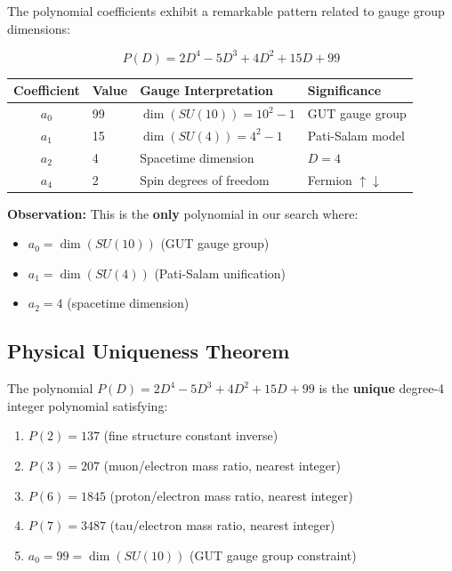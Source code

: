 \documentclass[11pt,a4paper]{article}
\begin{document}
The polynomial coefficients exhibit a remarkable pattern related to gauge group dimensions:

\[
P(D) = 2D^4 - 5D^3 + 4D^2 + 15D + 99
\]

\begin{center}
\begin{tabular}{clll}
\hline
Coefficient & Value & Gauge Interpretation & Significance \\
\hline
$a_0$ & 99 & $\dim(SU(10)) = 10^2 - 1$ & GUT gauge group \\
$a_1$ & 15 & $\dim(SU(4)) = 4^2 - 1$ & Pati-Salam model \\
$a_2$ & 4 & Spacetime dimension & $D = 4$ \\
$a_4$ & 2 & Spin degrees of freedom & Fermion $\uparrow\downarrow$ \\
\hline
\end{tabular}
\end{center}

\textbf{Observation:} This is the \textbf{only} polynomial in our search where:
\begin{itemize}
    \item $a_0 = \dim(SU(10))$ (GUT gauge group)
    \item $a_1 = \dim(SU(4))$ (Pati-Salam unification)
    \item $a_2 = 4$ (spacetime dimension)
\end{itemize}

\subsection{Physical Uniqueness Theorem}

\begin{theorem}
The polynomial $P(D) = 2D^4 - 5D^3 + 4D^2 + 15D + 99$ is the \textbf{unique} degree-4 integer polynomial satisfying:
\begin{enumerate}
    \item $P(2) = 137$ (fine structure constant inverse)
    \item $P(3) = 207$ (muon/electron mass ratio, nearest integer)
    \item $P(6) = 1845$ (proton/electron mass ratio, nearest integer)
    \item $P(7) = 3487$ (tau/electron mass ratio, nearest integer)
    \item $a_0 = 99 = \dim(SU(10))$ (GUT gauge group constraint)
\end{enumerate}
\end{theorem}
\end{document}
